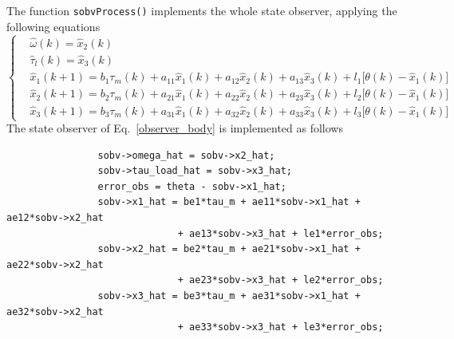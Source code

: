 \documentclass[12pt,a4paper,oneside]{book}
\begin{document}
\begin{onehalfspace}
	The function \texttt{sobvProcess()} implements the whole state observer, applying the following equations
	\begin{equation}\label{observer_body}
		\left\lbrace \begin{aligned}
			&\hat{\omega}(k) = \hat{x}_2(k) \\[6pt]		
			&\hat{\tau}_l(k) = \hat{x}_3(k) \\[6pt]
			&\hat{x}_1(k+1) = b_1\tau_m(k) + a_{11}\hat{x}_1(k) + a_{12}\hat{x}_2(k) + a_{13}\hat{x}_3(k) + l_1\Big[\theta(k)-\hat{x}_1(k)\Big] \\[6pt]
			&\hat{x}_2(k+1) = b_2\tau_m(k) + a_{21}\hat{x}_1(k) + a_{22}\hat{x}_2(k) + a_{23}\hat{x}_3(k) + l_2\Big[\theta(k)-\hat{x}_1(k)\Big] \\[6pt]
			&\hat{x}_3(k+1) = b_3\tau_m(k) + a_{31}\hat{x}_1(k) + a_{32}\hat{x}_2(k) + a_{33}\hat{x}_3(k) + l_3\Big[\theta(k)-\hat{x}_1(k)\Big]
		\end{aligned}\right. 
	\end{equation}
	The state observer of Eq.~\ref{observer_body} is implemented as follows
	\begin{mybox}
		{\selectfont \footnotesize \noindent
			\begin{verbatim}
				sobv->omega_hat = sobv->x2_hat;
				sobv->tau_load_hat = sobv->x3_hat;
				error_obs = theta - sobv->x1_hat;	
				sobv->x1_hat = be1*tau_m + ae11*sobv->x1_hat + ae12*sobv->x2_hat 
				              + ae13*sobv->x3_hat + le1*error_obs;	
				sobv->x2_hat = be2*tau_m + ae21*sobv->x1_hat + ae22*sobv->x2_hat 
				              + ae23*sobv->x3_hat + le2*error_obs;	
				sobv->x3_hat = be3*tau_m + ae31*sobv->x1_hat + ae32*sobv->x2_hat 
				              + ae33*sobv->x3_hat + le3*error_obs;
		\end{verbatim}}
	\end{mybox}
	

\end{onehalfspace}
\end{document}
